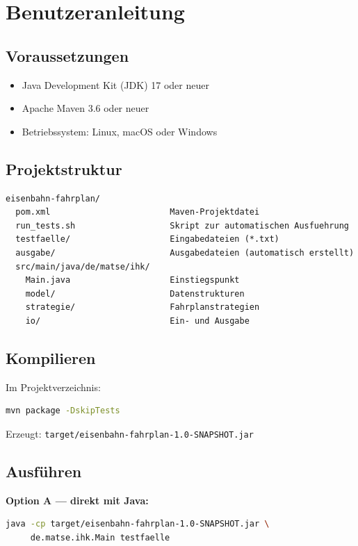 \documentclass[12pt,a4paper]{article}
\begin{document}
\section{Benutzeranleitung}
\label{sec:benutzeranleitung}

\subsection{Voraussetzungen}

\begin{itemize}
  \item Java Development Kit (JDK) 17 oder neuer
  \item Apache Maven 3.6 oder neuer
  \item Betriebssystem: Linux, macOS oder Windows
\end{itemize}

\subsection{Projektstruktur}

\begin{lstlisting}[language={}, numbers=none]
eisenbahn-fahrplan/
  pom.xml                        Maven-Projektdatei
  run_tests.sh                   Skript zur automatischen Ausfuehrung
  testfaelle/                    Eingabedateien (*.txt)
  ausgabe/                       Ausgabedateien (automatisch erstellt)
  src/main/java/de/matse/ihk/
    Main.java                    Einstiegspunkt
    model/                       Datenstrukturen
    strategie/                   Fahrplanstrategien
    io/                          Ein- und Ausgabe
\end{lstlisting}

\subsection{Kompilieren}

Im Projektverzeichnis:
\begin{lstlisting}[language=bash, numbers=none]
mvn package -DskipTests
\end{lstlisting}
Erzeugt: \texttt{target/eisenbahn-fahrplan-1.0-SNAPSHOT.jar}

\subsection{Ausführen}

\textbf{Option A — direkt mit Java:}
\begin{lstlisting}[language=bash, numbers=none]
java -cp target/eisenbahn-fahrplan-1.0-SNAPSHOT.jar \
     de.matse.ihk.Main testfaelle
\end{lstlisting}
\end{document}
